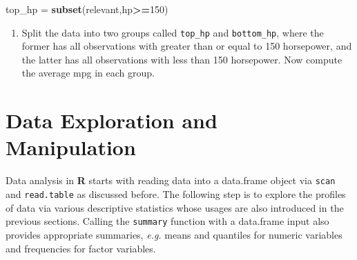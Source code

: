 \documentclass[
]{article}
\newenvironment{Shaded}{\begin{snugshade}}{\end{snugshade}}
\newcommand{\CommentTok}[1]{\textcolor[rgb]{0.56,0.35,0.01}{\textit{#1}}}
\newcommand{\DecValTok}[1]{\textcolor[rgb]{0.00,0.00,0.81}{#1}}
\newcommand{\KeywordTok}[1]{\textcolor[rgb]{0.13,0.29,0.53}{\textbf{#1}}}
\newcommand{\NormalTok}[1]{#1}
\newcommand{\OperatorTok}[1]{\textcolor[rgb]{0.81,0.36,0.00}{\textbf{#1}}}
\newcommand{\StringTok}[1]{\textcolor[rgb]{0.31,0.60,0.02}{#1}}
\providecommand{\tightlist}{%
  \setlength{\itemsep}{0pt}\setlength{\parskip}{0pt}}
\begin{document}
\begin{Shaded}
\begin{Highlighting}[]
\NormalTok{top_hp =}\StringTok{ }\KeywordTok{subset}\NormalTok{(relevant,hp}\OperatorTok{>=}\DecValTok{150}\NormalTok{)}
\end{Highlighting}
\end{Shaded}

\begin{enumerate}
\def\labelenumi{\arabic{enumi}.}
\setcounter{enumi}{3}
\tightlist
\item
  Split the data into two groups called \texttt{top\_hp} and
  \texttt{bottom\_hp}, where the former has all observations with
  greater than or equal to 150 horsepower, and the latter has all
  observations with less than 150 horsepower. Now compute the average
  mpg in each group.
\end{enumerate}

\begin{Shaded}
\end{Shaded}

\hypertarget{data-exploration-and-manipulation}{%
\section{Data Exploration and
Manipulation}\label{data-exploration-and-manipulation}}

Data analysis in \textbf{R} starts with reading data into a data.frame
object via \texttt{scan} and \texttt{read.table} as discussed before.
The following step is to explore the profiles of data via various
descriptive statistics whose usages are also introduced in the previous
sections. Calling the \texttt{summary} function with a data.frame input
also provides appropriate summaries, \emph{e.g.} means and quantiles for
numeric variables and frequencies for factor variables.
\end{document}
